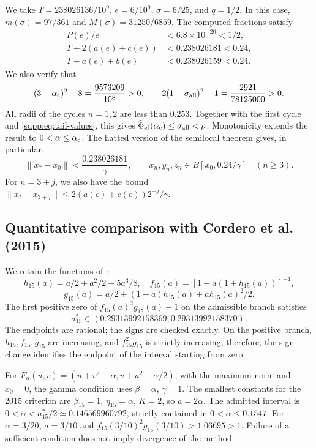 \documentclass[11pt,a4paper]{article}
\numberwithin{equation}{section}
\numberwithin{table}{section}
\theoremstyle{plain}
\theoremstyle{definition}\newtheorem{definition}[theorem]{Definition}
\theoremstyle{remark}\newtheorem{remark}[theorem]{Remark}
\begin{document}
We take $T=238026136/10^9$, $e=6/10^9$, $\sigma=6/25$, and $q=1/2$.
In this case, $m(\sigma)=97/361$ and $M(\sigma)=31250/6859$.
The computed fractions satisfy
\begin{equation}
 \begin{aligned}
 P(e)/e&<6.8\times10^{-20}<1/2,\\
 T+2(a(e)+c(e))&<0.238026181<0.24,\\
 T+a(e)+b(e)&<0.238026159<0.24.
 \end{aligned}\label{supp:eq:tail-values}
\end{equation}
We also verify that
\[
 (3-\alpha_{\rm c})^2-8=\frac{9573209}{10^8}>0,\qquad
 2(1-\sigma_{\rm all})^2-1=\frac{2921}{78125000}>0.
\]
All radii of the cycles $n=1,2$ are less than $0.253$.
Together with the first cycle and \eqref{supp:eq:tail-values}, this
gives $\widehat\Phi_{\rm ef}(\alpha_{\rm c})\leq\sigma_{\rm all}<\rho$.
Monotonicity extends the result to $0<\alpha\leq\alpha_{\rm c}$.
The hatted version of the semilocal theorem gives, in particular,
\[
 \|x_*-x_0\|<\frac{0.238026181}{\gamma},\qquad
 x_n,y_n,z_n\in B[x_0,0.24/\gamma]\quad(n\geq3).
\]
For $n=3+j$, we also have the bound
$\|x_*-x_{3+j}\|\leq2(a(e)+c(e))2^{-j}/\gamma$.

\subsection{Quantitative comparison with Cordero et al. (2015)}
We retain the functions of \cite{CorderoSemilocal2015}:
\[
 h_{15}(a)=a/2+a^2/2+5a^3/8,\quad
 f_{15}(a)=[1-a(1+h_{15}(a))]^{-1},
\]
\[
 g_{15}(a)=a/2+(1+a)h_{15}(a)+ah_{15}(a)^2/2.
\]
The first positive zero of $f_{15}(a)^2g_{15}(a)-1$ on the admissible
branch satisfies
\[
 a_{15}^*\in(0.29313992158369,0.29313992158370).
\]
The endpoints are rational; the signs are checked exactly. On the
positive branch, $h_{15},f_{15},g_{15}$ are increasing, and
$f_{15}^2g_{15}$ is strictly increasing; therefore, the sign change
identifies the endpoint of the interval starting from zero.

For $F_\alpha(u,v)=(u+v^2-\alpha,v+u^2-\alpha/2)$, with the maximum
norm and $x_0=0$, the gamma condition uses $\beta=\alpha$, $\gamma=1$.
The smallest constants for the 2015 criterion are $\beta_{15}=1$,
$\eta_{15}=\alpha$, $K=2$, so $a=2\alpha$.
The admitted interval is $0<\alpha<a_{15}^*/2\simeq0.146569960792$,
strictly contained in $0<\alpha\leq0.1547$.
For $\alpha=3/20$, $a=3/10$ and
$f_{15}(3/10)^2g_{15}(3/10)>1.06695>1$.
Failure of a sufficient condition does not imply divergence of the method.
\end{document}
